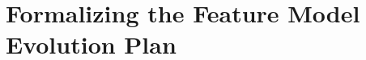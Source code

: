 \chapter{Formalizing the Feature Model Evolution Plan}
\label{cha:formalizing-the-feature-model-evolution-plan}






